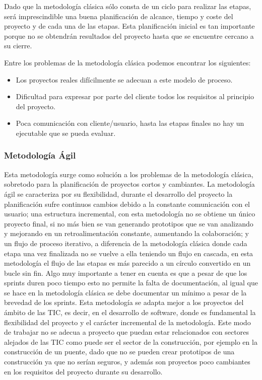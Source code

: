 Dado que la metodología clásica sólo consta de un ciclo para realizar las etapas, será imprescindible una buena planificación de alcance, tiempo y coste del proyecto y de cada una de las etapas. Esta planificación inicial es tan importante porque no se obtendrán resultados del proyecto hasta que se encuentre cercano a su cierre.

Entre los problemas de la metodología clásica podemos encontrar los siguientes:

\begin{itemize}
    \item Los proyectos reales difícilmente se adecuan a este modelo de proceso.
    \item Dificultad para expresar por parte del cliente todos los requisitos al principio del proyecto.
    \item Poca comunicación con cliente/usuario, hasta las etapas finales no hay un ejecutable que se pueda evaluar.
\end{itemize}


\subsubsection{Metodología Ágil}

Esta metodología surge como solución a los problemas de la metodología clásica, sobretodo para la planificación de proyectos cortos y cambiantes. La metodología ágil se caracteriza por su flexibilidad, durante el desarrollo del proyecto la planificación sufre continuos cambios debido a la constante comunicación con el usuario; una estructura incremental, con esta metodología no se obtiene un único proyecto final, si no más bien se van generando prototipos que se van analizando y mejorando en un retroalimentación constante, aumentando la colaboración; y un flujo de proceso iterativo, a diferencia de la metodología clásica donde cada etapa una vez finalizada no se vuelve a ella teniendo un flujo en cascada, en esta metodología el flujo de las etapas es más parecido a un círculo convertido en un bucle sin fin. Algo muy importante a tener en cuenta es que a pesar de que los sprints duren poco tiempo esto no permite la falta de documentación, al igual que se hace en la metodología clásica se debe documentar un mínimo a pesar de la brevedad de los sprints. Esta metodología se adapta mejor a los proyectos del ámbito de las TIC, es decir, en el desarrollo de software, donde es fundamental la flexibilidad del proyecto y el carácter incremental de la metodología. Este modo de trabajar no se adecua a proyecto que puedan estar relacionados con sectores alejados de las TIC como puede ser el sector de la construcción, por ejemplo en la construcción de un puente, dado que no se pueden crear prototipos de una construcción ya que no serían seguros, y además son proyectos poco cambiantes en los requisitos del proyecto durante su desarrollo.

